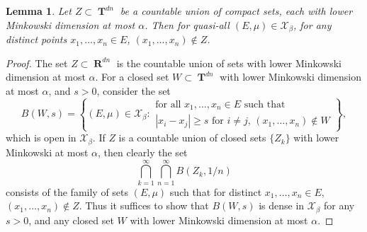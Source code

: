\documentclass[12pt,reqno]{article}
\numberwithin{equation}{section}
\DeclareMathOperator{\RR}{\mathbf{R}}
\DeclareMathOperator{\TT}{\mathbf{T}}
\newtheorem{lemma}[theorem]{Lemma}
\numberwithin{theorem}{section}
\begin{document}
\begin{lemma} \label{LemmaVIVIJCIJSIJ}
    Let $Z \subset \TT^{dn}$ be a countable union of compact sets, each with lower Minkowski dimension at most $\alpha$. Then for quasi-all $(E,\mu) \in \mathcal{X}_\beta$, for any distinct points $x_1, \dots, x_n \in E$, $(x_1, \dots, x_n) \not \in Z$.
\end{lemma}
\begin{proof}
    The set $Z \subset \RR^{dn}$ is the countable union of sets with lower Minkowski dimension at most $\alpha$. For a closed set $W \subset \TT^{dn}$ with lower Minkowski dimension at most $\alpha$, and $s > 0$, consider the set
    \[ B(W,s) = \left\{ (E,\mu) \in \mathcal{X}_\beta: \begin{array}{c}
            \text{for all $x_1, \dots, x_n \in E$ such that}\\
            \text{$|x_i - x_j| \geq s$ for $i \neq j$, $(x_1, \dots, x_n) \not \in W$}
        \end{array} \right\}, \]
    which is open in $\mathcal{X}_\beta$.
    If $Z$ is a countable union of closed sets $\{ Z_k \}$ with lower Minkowski at most $\alpha$, then clearly the set
    \[ \bigcap_{k = 1}^\infty \bigcap_{n = 1}^\infty B(Z_k,1/n) \]
    consists of the family of sets $(E,\mu)$ such that for distinct $x_1, \dots, x_n \in E$, $(x_1, \dots, x_n) \not \in Z$. Thus it suffices to show that $B(W,s)$ is dense in $\mathcal{X}_\beta$ for any $s > 0$, and any closed set $W$ with lower Minkowski dimension at most $\alpha$.


\end{proof}
\end{document}
